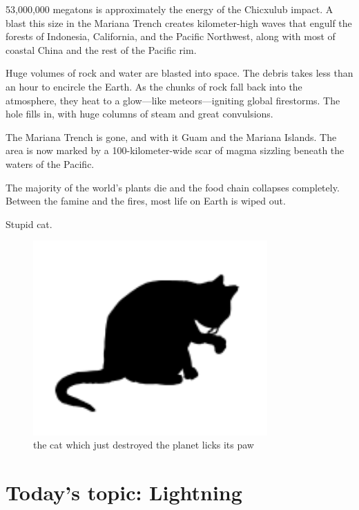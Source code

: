 {53,000,000 megatons is approximately the energy of the Chicxulub impact. A blast this size in the Mariana Trench creates kilometer-high waves that engulf the forests of Indonesia, California, and the Pacific Northwest, along with most of coastal China and the rest of the Pacific rim.}

{Huge volumes of rock and water are blasted into space. The debris takes less than an hour to encircle the Earth. As the chunks of rock fall back into the atmosphere, they heat to a glow—like meteors—igniting global firestorms. The hole fills in, with huge columns of steam and great convulsions.}

{The Mariana Trench is gone, and with it Guam and the Mariana Islands. The area is now marked by a 100-kilometer-wide scar of magma sizzling beneath the waters of the Pacific.}

{The majority of the world’s plants die and the food chain collapses completely. Between the famine and the fires, most life on Earth is wiped out.}

{Stupid cat.}

\begin{figure}[!htbp]
\centering
\includegraphics[scale=0.5, max width=0.8\textwidth]{imgs/a/15/mariana_satisfied.png}
\caption{the cat which just destroyed the planet licks its paw}
\end{figure}

{
\chapter{Today's topic: Lightning}
}

